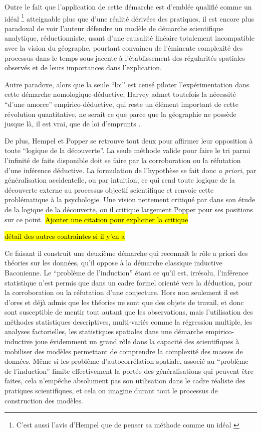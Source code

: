 Outre le fait que l'application de cette démarche est d'emblée qualifié comme un idéal \footnote{C'est aussi l'avis d'Hempel que de penser sa méthode comme un idéal \autocite{Besse2000}} atteignable plus que d'une réalité dérivées des pratiques, il est encore plus paradoxal de voir l'auteur défendre un modèle de démarche scientifique analytique, réductionniste, usant d'une causalité linéaire totalement incompatible avec la vision du géographe, pourtant convaincu de l'éminente complexité des processus dans le temps sous-jacente à l'établissement des régularités spatiales observés et de leurs importances dans l'explication. \autocite[57-58]{Paterson1984}

Autre paradoxe, alors que la seule \enquote{loi} est censé piloter l’expérimentation dans cette démarche nomologique-déductive, Harvey admet toutefois la nécessité \enquote{d'une amorce} empirico-déductive, qui reste un élément important de cette révolution quantitative, ne serait ce que parce que la géographie ne possède jusque là, il est vrai, que de loi d'emprunts \autocite[41-42]{Harvey1969}. 

De plus, Hempel et Popper se retrouve tout deux pour affirmer leur opposition à toute \enquote{logique de la découverte}. La seule méthode valide pour faire le tri parmi l'infinité de faits disponible doit se faire par la corroboration ou la réfutation d'une inférence déductive. La formulation de l'hypothèse se fait donc \textit{a priori}, par généralisation accidentelle, ou par intuition, ce qui rend toute logique de la découverte externe au processus objectif scientifique et renvoie cette problématique à la psychologie. Une vision nettement critiqué par \textcite{Simon1973} dans son étude de la logique de la découverte, ou il critique largement Popper pour ses positions sur ce point. \hl {Ajouter une citation pour expliciter la critique}

\hl{détail des autres contraintes si il y'en a}

Ce faisant il construit une deuxième démarche qui reconnaît le rôle a priori des théories sur les données, qu'il oppose à la démarche classique inductive Baconienne. Le \enquote{problème de l'induction} étant ce qu'il est, irrésolu, l'inférence statistique n'est permis que dans un cadre formel orienté vers la déduction, pour la corroboration ou la réfutation d'une conjecture. Hors non seulement il est d'ores et déjà admis que les théories ne sont que des objets de travail, et donc sont susceptible de mentir tout autant que les observations, mais l'utilisation des méthodes statistiques descriptives, multi-variés comme la régression multiple, les analyses factorielles, les statistiques spatiales dans une démarche empirico-inductive joue évidemment un grand rôle dans la capacité des scientifiques à mobiliser des modèles permettant de comprendre la complexité des masses de données. Même si les problème d'autocorrélation spatiale, associé au \enquote{problème de l'induction} limite effectivement la portée des généralisations qui peuvent être faites, cela n’empêche absolument pas son utilisation dans le cadre réaliste des pratiques scientifiques, et cela on imagine durant tout le processus de construction des modèles.


